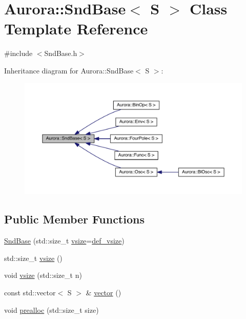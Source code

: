 \hypertarget{class_aurora_1_1_snd_base}{}\section{Aurora\+:\+:Snd\+Base$<$ S $>$ Class Template Reference}
\label{class_aurora_1_1_snd_base}


{\ttfamily \#include $<$Snd\+Base.\+h$>$}



Inheritance diagram for Aurora\+:\+:Snd\+Base$<$ S $>$\+:
\nopagebreak
\begin{figure}[H]
\begin{center}
\leavevmode
\includegraphics[width=350pt]{class_aurora_1_1_snd_base__inherit__graph}
\end{center}
\end{figure}
\subsection*{Public Member Functions}
\begin{DoxyCompactItemize}
\item 
\hyperlink{class_aurora_1_1_snd_base_a960739d3ae63df581c28f8801e589a3c}{Snd\+Base} (std\+::size\+\_\+t \hyperlink{class_aurora_1_1_snd_base_ad68387541cc3d696d0cf58d474f94b73}{vsize}=\hyperlink{namespace_aurora_afaaddf667a06e7ce23c667a8b7295263}{def\+\_\+vsize})
\item 
std\+::size\+\_\+t \hyperlink{class_aurora_1_1_snd_base_ad68387541cc3d696d0cf58d474f94b73}{vsize} ()
\item 
void \hyperlink{class_aurora_1_1_snd_base_a88dacba995eef179f2fc97e11a331913}{vsize} (std\+::size\+\_\+t n)
\item 
const std\+::vector$<$ S $>$ \& \hyperlink{class_aurora_1_1_snd_base_aecf7b916b5b459b5ac2855997fd2aec6}{vector} ()
\item 
void \hyperlink{class_aurora_1_1_snd_base_a5d57c3b735e5d583b4b4ae5f8e9cdf4c}{prealloc} (std\+::size\+\_\+t size)
\end{DoxyCompactItemize}
